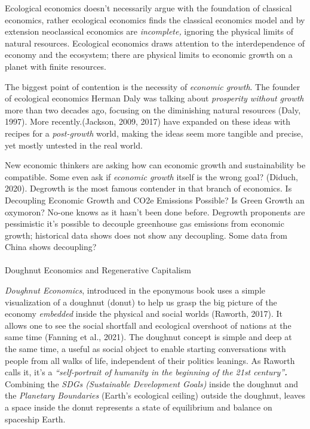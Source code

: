\documentclass[
  letterpaper,
  DIV=11,
  numbers=noendperiod]{scrartcl}
\makeatletter
\let\oldparagraph\paragraph
\renewcommand{\paragraph}{
    \@ifstar
      \xxxParagraphStar
      \xxxParagraphNoStar
  }
\newcommand{\xxxParagraphStar}[1]{\oldparagraph*{#1}\mbox{}}
\newcommand{\xxxParagraphNoStar}[1]{\oldparagraph{#1}\mbox{}}
\makeatother
\begin{document}
Ecological economics doesn't necessarily argue with the foundation of
classical economics, rather ecological economics finds the classical
economics model and by extension neoclassical economics are
\emph{incomplete,} ignoring the physical limits of natural resources.
Ecological economics draws attention to the interdependence of economy
and the ecosystem; there are physical limits to economic growth on a
planet with finite resources.

The biggest point of contention is the necessity of \emph{economic
growth}. The founder of ecological economics Herman Daly was talking
about \emph{prosperity without growth} more than two decades ago,
focusing on the diminishing natural resources (Daly, 1997). More
recently.(Jackson, 2009, 2017) have expanded on these ideas with recipes
for a \emph{post-growth} world, making the ideas seem more tangible and
precise, yet mostly untested in the real world.

New economic thinkers are asking how can economic growth and
sustainability be compatible. Some even ask if \emph{economic growth}
itself is the wrong goal? (Diduch, 2020). Degrowth is the most famous
contender in that branch of economics. Is Decoupling Economic Growth and
CO2e Emissions Possible? Is Green Growth an oxymoron? No-one knows as it
hasn't been done before. Degrowth proponents are pessimistic it's
possible to decouple greenhouse gas emissions from economic growth;
historical data shows does not show any decoupling. Some data from China
shows decoupling?

\paragraph{Doughnut Economics and Regenerative
Capitalism}\label{doughnut-economics-and-regenerative-capitalism}

\emph{Doughnut Economics}, introduced in the eponymous book uses a
simple visualization of a doughnut (donut) to help us grasp the big
picture of the economy \emph{embedded} inside the physical and social
worlds (Raworth, 2017). It allows one to see the social shortfall and
ecological overshoot of nations at the same time (Fanning et al., 2021).
The doughnut concept is simple and deep at the same time, a useful as
social object to enable starting conversations with people from all
walks of life, independent of their politics leanings. As Raworth calls
it, it's a \emph{``self-portrait of humanity in the beginning of the
21st century''\textbf{.}} Combining the \emph{SDGs (Sustainable
Development Goals)} inside the doughnut and the \emph{Planetary
Boundaries} (Earth's ecological ceiling) outside the doughnut, leaves a
space inside the donut represents a state of equilibrium and balance on
spaceship Earth.
\end{document}
